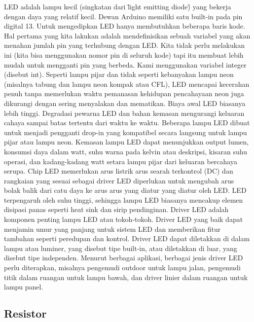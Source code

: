 LED adalah lampu kecil (singkatan dari \"light emitting diode\") yang bekerja dengan daya yang relatif kecil. Dewan Arduino memiliki satu built-in pada pin digital 13.
Untuk mengedipkan LED hanya membutuhkan beberapa baris kode. Hal pertama yang kita lakukan adalah mendefinisikan sebuah variabel yang akan menahan jumlah pin yang 
terhubung dengan LED. Kita tidak perlu melakukan ini (kita bisa menggunakan nomor pin di seluruh kode) tapi itu membuat lebih mudah untuk mengganti pin yang berbeda. 
Kami menggunakan variabel integer (disebut int). Seperti lampu pijar dan tidak seperti kebanyakan lampu neon (misalnya tabung dan lampu neon kompak atau CFL), LED mencapai kecerahan penuh tanpa memerlukan waktu pemanasan kehidupan pencahayaan neon juga dikurangi dengan sering menyalakan dan mematikan. Biaya awal LED biasanya lebih tinggi. Degradasi pewarna LED dan bahan kemasan mengurangi keluaran cahaya sampai batas tertentu dari waktu ke waktu.
Beberapa lampu LED dibuat untuk menjadi pengganti drop-in yang kompatibel secara langsung untuk lampu pijar atau lampu neon. Kemasan lampu LED dapat menunjukkan output lumen, konsumsi daya dalam watt, suhu warna pada kelvin atau deskripsi, kisaran suhu operasi, dan kadang-kadang watt setara lampu pijar dari keluaran bercahaya serupa. Chip LED memerlukan arus listrik arus searah terkontrol (DC) dan rangkaian yang sesuai sebagai driver LED diperlukan untuk mengubah arus bolak balik dari catu daya ke arus arus yang diatur yang diatur oleh LED. LED terpengaruh oleh suhu tinggi, sehingga lampu LED biasanya mencakup elemen disipasi panas seperti heat sink dan sirip pendinginan. Driver LED adalah komponen penting lampu LED atau tokoh-tokoh. Driver LED yang baik dapat menjamin umur yang panjang untuk sistem LED dan memberikan fitur tambahan seperti peredupan dan kontrol. Driver LED dapat diletakkan di dalam lampu atau luminer, yang disebut tipe built-in, atau diletakkan di luar, yang disebut tipe independen. Menurut berbagai aplikasi, berbagai jenis driver LED perlu diterapkan, misalnya pengemudi outdoor untuk lampu jalan, pengemudi titik dalam ruangan untuk lampu bawah, dan driver linier dalam ruangan untuk lampu panel.
\subsection{Resistor}

